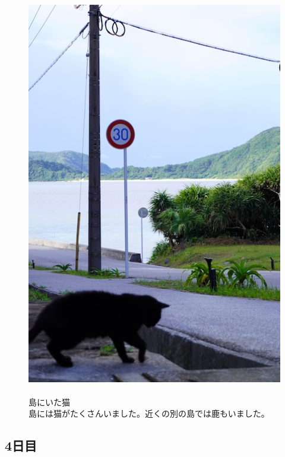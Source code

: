 \documentclass[../main]{subfiles}
\begin{document}
\begin{figure}[H]
  \begin{minipage}[b]{0.48\columnwidth}
    \centering
    \includegraphics[width=0.8\columnwidth]{figure/zamami_neko.jpg}
  \end{minipage}
  \hspace{0.04\columnwidth} %
  \begin{minipage}[b]{0.48\columnwidth}
    \caption{\\
    島にいた猫\\
    島には猫がたくさんいました。近くの別の島では鹿もいました。
    }
  \end{minipage}
\end{figure}

\subsection{4日目}
\end{document}

